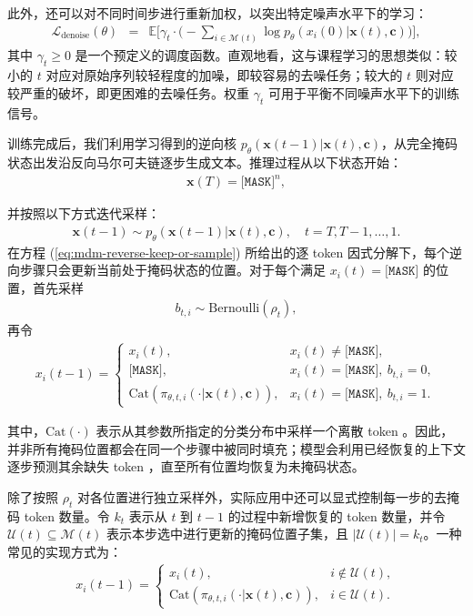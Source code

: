 \documentclass[UTF8,a4paper,zihao=-4,oneside,openany]{ctexbook}
\begin{document}
\noindent 此外，还可以对不同时间步进行重新加权，以突出特定噪声水平下的学习：
\begin{eqnarray}
\mathcal{L}_{\text{denoise}}(\theta)
& = &
\mathbb{E}\Bigg[
\gamma_t \cdot
\Big(-\sum_{i\in \mathcal{M}(t)} \log p_\theta(x_i(0)| \mathbf{x}(t),\mathbf{c})\Big)
\Bigg],
\label{eq:mdm-denoise-ce-weighted}
\end{eqnarray}
其中 $\gamma_t\ge 0$ 是一个预定义的调度函数。直观地看，这与课程学习的思想类似：较小的 $t$ 对应对原始序列较轻程度的加噪，即较容易的去噪任务；较大的 $t$ 则对应较严重的破坏，即更困难的去噪任务。权重 $\gamma_t$ 可用于平衡不同噪声水平下的训练信号。

训练完成后，我们利用学习得到的逆向核 $p_\theta(\mathbf{x}(t-1)| \mathbf{x}(t),\mathbf{c})$，从完全掩码状态出发沿反向马尔可夫链逐步生成文本。推理过程从以下状态开始：
\begin{eqnarray}
\mathbf{x}(T) = \texttt{[MASK]}^n,
\end{eqnarray}

\noindent 并按照以下方式迭代采样：
\begin{eqnarray}
\mathbf{x}(t-1) \sim p_\theta(\mathbf{x}(t-1)| \mathbf{x}(t),\mathbf{c}), \quad t=T,T-1,\dots,1.
\label{eq:mdm-sampling-chain}
\end{eqnarray}
在方程 (\ref{eq:mdm-reverse-keep-or-sample}) 所给出的逐 token 因式分解下，每个逆向步骤只会更新当前处于掩码状态的位置。对于每个满足 $x_i(t)=\texttt{[MASK]}$ 的位置，首先采样
\begin{eqnarray}
b_{t,i}\sim\mathrm{Bernoulli}(\rho_t),
\end{eqnarray}
再令
\begin{eqnarray}
x_i(t-1) =
\begin{cases}
x_i(t), & x_i(t)\neq \texttt{[MASK]},\\
\texttt{[MASK]}, & x_i(t)=\texttt{[MASK]},\ b_{t,i}=0,\\
\mathrm{Cat}\!\left(\pi_{\theta,t,i}( \cdot | \mathbf{x}(t),\mathbf{c})\right),
& x_i(t)=\texttt{[MASK]},\ b_{t,i}=1.
\end{cases}
\end{eqnarray}

\noindent 其中，$\mathrm{Cat}(\cdot)$ 表示从其参数所指定的分类分布中采样一个离散 token 。因此，并非所有掩码位置都会在同一个步骤中被同时填充；模型会利用已经恢复的上下文逐步预测其余缺失 token ，直至所有位置均恢复为未掩码状态。

除了按照 $\rho_t$ 对各位置进行独立采样外，实际应用中还可以显式控制每一步的去掩码 token 数量。令 $k_t$ 表示从 $t$ 到 $t-1$ 的过程中新增恢复的 token 数量，并令 $\mathcal{U}(t)\subseteq \mathcal{M}(t)$ 表示本步选中进行更新的掩码位置子集，且 $|\mathcal{U}(t)| = k_t$。一种常见的实现方式为：
\begin{eqnarray}
x_i(t-1) =
\begin{cases}
x_i(t), & i\notin \mathcal{U}(t),\\
\mathrm{Cat}\!\left(\pi_{\theta,t,i}(\cdot | \mathbf{x}(t),\mathbf{c})\right), & i\in \mathcal{U}(t).
\end{cases}
\label{eq:mdm-partial-update}
\end{eqnarray}
\end{document}
